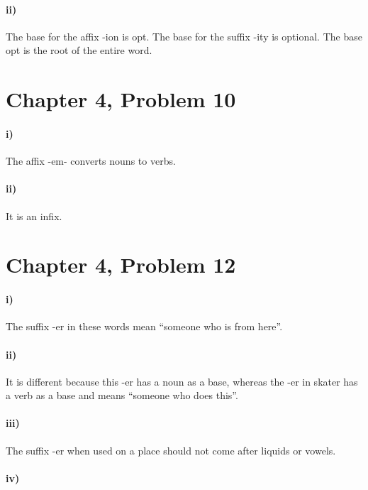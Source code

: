 \documentclass[12pt]{article}
\begin{document}
\paragraph{ii)}

The base for the affix -ion is opt. The base for the suffix -ity is optional. The base opt is the root of
the entire word.

\section*{Chapter 4, Problem 10}

\paragraph{i)}

The affix -em- converts nouns to verbs.

\paragraph{ii)}

It is an infix.

\section*{Chapter 4, Problem 12}

\paragraph{i)}

The suffix -er in these words mean ``someone who is from here''.

\paragraph{ii)}

It is different because this -er has a noun as a base, whereas the -er in
skater has a verb as a base and means ``someone who does this''.

\paragraph{iii)}

The suffix -er when used on a place should not come after liquids or vowels.

\paragraph{iv)}
\end{document}
